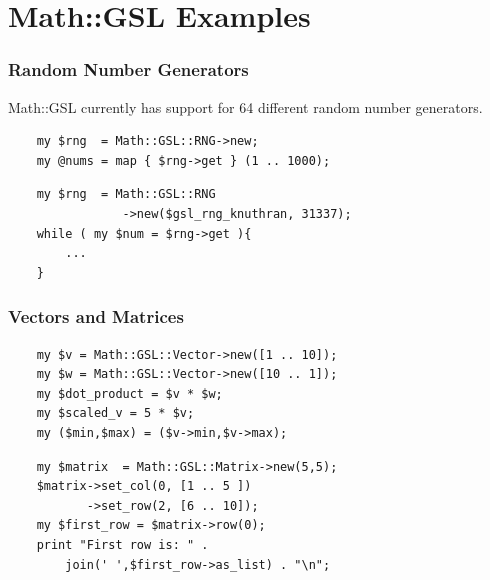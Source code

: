 \documentclass[12pt]{beamer}
\begin{document}
\section{Math::GSL Examples}
\begin{frame}[fragile]
    \frametitle{Random Number Generators}
    Math::GSL currently has support for 64 different random number generators.
    \begin{center}
    \begin{small}
    \begin{verbatim}
    my $rng  = Math::GSL::RNG->new;
    my @nums = map { $rng->get } (1 .. 1000);
    \end{verbatim}

    \begin{verbatim}
    my $rng  = Math::GSL::RNG
                ->new($gsl_rng_knuthran, 31337);
    while ( my $num = $rng->get ){
        ...
    }
    \end{verbatim}
    \end{small}
    \end{center}
\end{frame}

\begin{frame}[fragile]
    \frametitle{Vectors and Matrices}
    \begin{center}
    \begin{small}
    \begin{verbatim}
    my $v = Math::GSL::Vector->new([1 .. 10]);
    my $w = Math::GSL::Vector->new([10 .. 1]);
    my $dot_product = $v * $w;
    my $scaled_v = 5 * $v;
    my ($min,$max) = ($v->min,$v->max);

    \end{verbatim}

    \begin{verbatim}
    my $matrix  = Math::GSL::Matrix->new(5,5);
    $matrix->set_col(0, [1 .. 5 ])
           ->set_row(2, [6 .. 10]);
    my $first_row = $matrix->row(0);
    print "First row is: " . 
        join(' ',$first_row->as_list) . "\n";

    \end{verbatim}
    \end{small}
    \end{center}
\end{frame}
\end{document}
